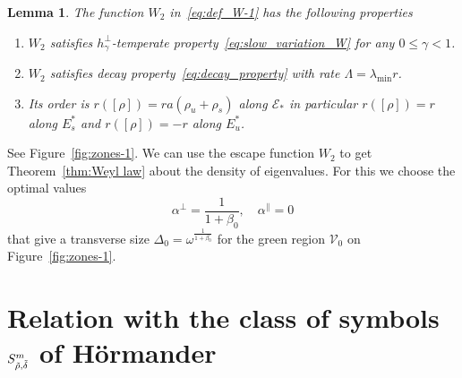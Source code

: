 \documentclass[10pt]{amsart}
\newtheorem{lemm}[theo]{Lemma}\newtheorem{prop}[theo]{Proposition}\newtheorem{coro}[theo]{Corollary}\newtheorem{conj}[theo]{Conjecture}
\theoremstyle{definition}\newtheorem{defi}[theo]{Definition}\newtheorem{rema}[theo]{Remark}\newtheorem{exam}[theo]{Example}\newtheorem{exem}[theo]{Example}\newtheorem{nota}[theo]{Notation}
\newcommand{\clV}{\mathcal{V}}
\newcommand{\clE}{\mathcal{E}}
\let\oldtilde\tilde
\renewcommand*{\tilde}[1]{\mathchoice{\widetilde{#1}}{\widetilde{#1}}{\oldtilde{#1}}{\oldtilde{#1}}}
\begin{document}
\begin{cBoxB}{}
\begin{lemm}
The function $W_{2}$ in~\eqref{eq:def_W-1} has the following properties
\begin{enumerate}
\item \label{enu:-satisfies--temperate}
$W_{2}$ satisfies $h_{\gamma}^{\perp}$-temperate property~\eqref{eq:slow_variation_W} for any $0\leq\gamma<1$.
\item \label{enu:-satisfies-decay}
$W_{2}$ satisfies decay property~\eqref{eq:decay_property} with rate $\Lambda=\lambda_{\min}r$.
\item \label{enu:Its-order-is}
Its order is $r([\rho])=ra(\rho_{u}+\rho_{s})$ along $\clE_{*}$ in particular $r([\rho])=r$ along $E_{s}^{*}$ and $r([\rho])=-r$ along $E_{u}^{*}$.
\end{enumerate}
\end{lemm}
\end{cBoxB}

See Figure~\ref{fig:zones-1}. We can use the escape function $W_{2}$ to get Theorem~\ref{thm:Weyl law} about the density of eigenvalues. For this we choose the optimal values
\[
\alpha^{\perp}=\frac{1}{1+\beta_{0}},\quad\alpha^{\parallel}=0
\]
that give a transverse size $\Delta_{0}=\omega^{\frac{1}{1+\beta_{0}}}$ for the green region $\clV_{0}$ on Figure~\ref{fig:zones-1}.



\section{\label{sec:Hormander}
Relation with the class of symbols \texorpdfstring{$S_{\tilde{\rho},\tilde{\delta}}^{m}$}{S rho, deltam} of H\"ormander}
\end{document}
